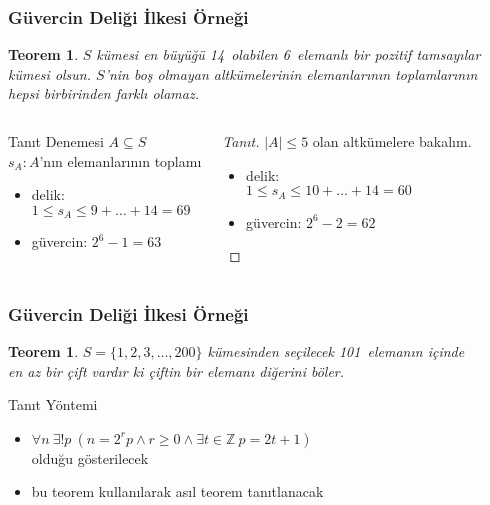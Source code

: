 \documentclass[dvipsnames]{beamer}
\theoremstyle{definition}
\theoremstyle{example}
\theoremstyle{plain}
\newtheorem{teorem}[theorem]{Teorem}
\begin{document}
\begin{frame}
  \frametitle{Güvercin Deliği İlkesi Örneği}

  \begin{teorem}
    $S$ kümesi en büyüğü 14~olabilen 6~elemanlı bir pozitif tamsayılar kümesi
    olsun. $S$'nin boş olmayan altkümelerinin elemanlarının toplamlarının hepsi
    birbirinden farklı olamaz.
  \end{teorem}

  \pause
  \begin{columns}[t]
    \begin{block}{Tanıt Denemesi}
      $A \subseteq S$\\
      $s_A: A$'nın elemanlarının toplamı

      \pause
      \begin{itemize}
        \item delik:\\
          $1 \leq s_A \leq 9 + \dots + 14 = 69$
        \item güvercin: $2^6 - 1 = 63$
      \end{itemize}
    \end{block}

    \pause
    \begin{proof}[Tanıt]
      $|A| \leq 5$ olan altkümelere bakalım.

      \pause
      \begin{itemize}
        \item delik:\\
          $1 \leq s_A \leq 10 + \dots + 14 = 60$
        \item güvercin: $2^6 - 2 = 62$
      \end{itemize}
    \end{proof}
  \end{columns}
\end{frame}

\begin{frame}
  \frametitle{Güvercin Deliği İlkesi Örneği}

  \begin{teorem}
    $S = \{1,2,3,\dots,200\}$ kümesinden seçilecek 101~elemanın içinde\\
    en az bir çift vardır ki çiftin bir elemanı diğerini böler.
  \end{teorem}

  \pause
  \begin{block}{Tanıt Yöntemi}
    \begin{itemize}
      \item $\forall n~\exists ! p~
        (n = 2^r p \wedge r \geq 0 \wedge \exists t \in \mathbb Z~p = 2t + 1)$\\
      olduğu gösterilecek

      \item bu teorem kullanılarak asıl teorem tanıtlanacak
    \end{itemize}
  \end{block}
\end{frame}
\end{document}
